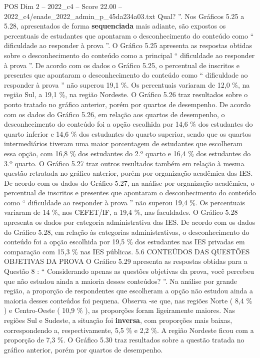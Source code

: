 \begin{textsample}{POS Dim 2 – 2022\_c4 – Score 22.00 – 2022\_c4/enade\_2022\_admin\_p\_45da234a03.txt}
Qual? ”.
Nos Gráficos 5.25 a 5.28, apresentados de forma \textbf{sequenciada} mais adiante, são expostos os percentuais de estudantes que apontaram o desconhecimento do conteúdo como “ dificuldade ao responder à prova ”.
O Gráfico 5.25 apresenta as respostas obtidas sobre o desconhecimento do conteúdo como a principal “ dificuldade ao responder à prova ”.
De acordo com os dados o Gráfico 5.25, o percentual de inscritos e presentes que apontaram o desconhecimento do conteúdo como “ dificuldade ao responder à prova ” não superou 19,1 \%.
Os percentuais variaram de 12,0 \%, na região Sul, a 19,1 \%, na região Nordeste.
O Gráfico 5.26 traz resultados sobre o ponto tratado no gráfico anterior, porém por quartos de desempenho.
De acordo com os dados do Gráfico 5.26, em relação aos quartos de desempenho, o desconhecimento do conteúdo foi a opção escolhida por 14,6 \% dos estudantes do quarto inferior e 14,6 \% dos estudantes do quarto superior, sendo que os quartos intermediários tiveram uma maior porcentagem de estudantes que escolheram essa opção, com 16,8 \% dos estudantes do 2.º quarto e 16,4 \% dos estudantes do 3.º quarto.
O Gráfico 5.27 traz outros resultados também em relação à mesma questão retratada no gráfico anterior, porém por organização acadêmica das IES.
De acordo com os dados do Gráfico 5.27, na análise por organização acadêmica, o percentual de inscritos e presentes que apontaram o desconhecimento do conteúdo como “ dificuldade ao responder à prova ” não superou 19,4 \%.
Os percentuais variaram de 14 \%, nos CEFET/IF, a 19,4 \%, nas faculdades.
O Gráfico 5.28 apresenta os dados por categoria administrativa das IES.
De acordo com os dados do Gráfico 5.28, em relação às categorias administrativas, o desconhecimento do conteúdo foi a opção escolhida por 19,5 \% dos estudantes nas IES privadas em comparação com 15,3 \% nas IES públicas. 5.6 CONTEÚDOS DAS QUESTÕES OBJETIVAS DA PROVA O Gráfico 5.29 apresenta as respostas obtidas para a Questão 8 : “ Considerando apenas as questões objetivas da prova, você percebeu que não estudou ainda a maioria desses conteúdos? ”.
Na análise por grande região, a proporção de respondentes que escolheram a opção não estudou ainda a maioria desses conteúdos foi pequena.
Observa -se que, nas regiões Norte ( 8,4 \% ) e Centro-Oeste ( 10,9 \% ), as proporções foram ligeiramente maiores.
Nas regiões Sul e Sudeste, a situação foi \textbf{inversa}, com proporções mais baixas, correspondendo a, respectivamente, 5,5 \% e 2,2 \%.
A região Nordeste ficou com a proporção de 7,3 \%.
O Gráfico 5.30 traz resultados sobre a questão tratada no gráfico anterior, porém por quartos de desempenho.

\end{textsample}
